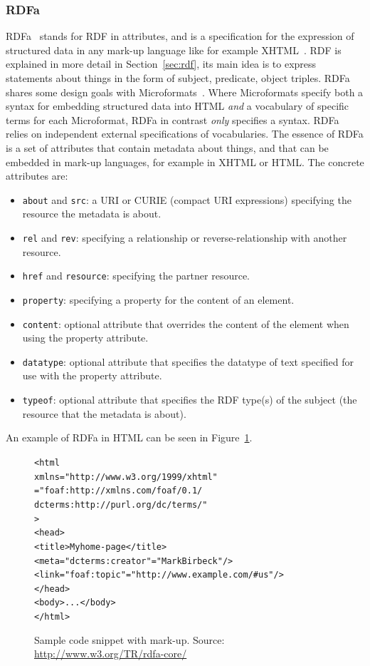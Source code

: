 \documentclass[12pt]{article}
\newenvironment{code}[1]
{\begin{lrbox}{\inverbatim}\begin{minipage}{13.5cm}\begin{alltt}{#1}}
{\end{alltt}\end{minipage}\end{lrbox}\colorbox{lightgray}{\usebox{\inverbatim}}}
\begin{document}
\subsubsection{RDFa}
RDFa~ stands for RDF in attributes, and is a specification for the expression of structured data in any mark-up language like for example XHTML~\cite{xhtml10sec}. RDF is explained in more detail in Section~\ref{sec:rdf}, its main idea is to express statements about things in the form of subject, predicate, object triples. RDFa shares some design goals with Microformats~\cite{microformats}. Where Microformats specify both a syntax for embedding structured data into HTML \emph{and} a vocabulary of specific terms for each Microformat, RDFa in contrast \emph{only} specifies a syntax. RDFa relies on independent external specifications of vocabularies. The essence of RDFa is a set of attributes that contain metadata about things, and that can be embedded in mark-up languages, for example in XHTML or HTML. The concrete attributes are:
\begin{itemize}
\item \texttt{about} and \texttt{src}: a URI or CURIE (compact URI expressions) specifying the resource the metadata is about.
\item \texttt{rel} and \texttt{rev}: specifying a relationship or reverse-relationship with another resource.
\item \texttt{href} and \texttt{resource}: specifying the partner resource.
\item \texttt{property}: specifying a property for the content of an element.
\item \texttt{content}: optional attribute that overrides the content of the element when using the property attribute.
\item \texttt{datatype}: optional attribute that specifies the datatype of text specified for use with the property attribute.
\item \texttt{typeof}: optional attribute that specifies the RDF type(s) of the subject (the resource that the metadata is about).
\end{itemize}
An example of RDFa in HTML can be seen in Figure~\ref{code:rdfa}.

\begin{figure}[htbp!]
\begin{center}
{\footnotesize
\begin{code}
<html
  xmlns="http://www.w3.org/1999/xhtml"
  ="foaf: http://xmlns.com/foaf/0.1/
          dcterms: http://purl.org/dc/terms/"
>
  <head>
    <title>My home-page</title>
    <meta ="dcterms:creator" ="Mark Birbeck" />
    <link ="foaf:topic" ="http://www.example.com/#us" />
  </head>
  <body>...</body>
</html>
\end{code}}
  \caption[Sample code snippet with RDFa mark-up.]{Sample code snippet with  mark-up. Source: \url{http://www.w3.org/TR/rdfa-core/}}
  \label{code:rdfa} 
  \end{center}  
\end{figure}
\end{document}
